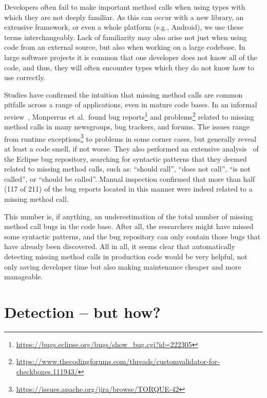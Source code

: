 Developers often fail to make important method calls when using types with which they are not deeply familiar.
As this can occur with a new library, an extensive framework, or even a whole platform (e.g., Android), we use these terms interchangeably.
Lack of familiarity may also arise not just when using code from an external source, but also when working on a large codebase.
In large software projects it is common that one developer does not know all of the code, and thus, they will often encounter types which they do not know how to use correctly.

Studies have confirmed the intuition that missing method calls are common pitfalls across a range of applications, even in mature code bases.
In an informal review~\cite{monperrus2010detecting}, Monperrus et al.\ found bug reports\footnote{\url{https://bugs.eclipse.org/bugs/show_bug.cgi?id=222305}} and problems\footnote{\url{https://www.thecodingforums.com/threads/customvalidator-for-checkboxes.111943/}} related to missing method calls in many newsgroups, bug trackers, and forums.
The issues range from runtime exceptions\footnote{\url{https://issues.apache.org/jira/browse/TORQUE-42}} to problems in some corner cases, but generally reveal at least a code smell, if not worse.
They also performed an extensive analysis~\cite{monperrus2013detecting} of the Eclipse bug repository,
searching for syntactic patterns that they deemed related to missing method calls, such as: ``should call'', ``does not call'', ``is not called'', or ``should be called''.
Manual inspection confirmed that more than half (117 of 211) of the bug reports located in this manner were indeed related to a missing method call.

This number is, if anything, an underestimation of the total number of missing method call bugs in the code base.
After all, the researchers might have missed some syntactic patterns, and the bug repository can only contain those bugs that have already been discovered.
All in all, it seems clear that automatically detecting missing method calls in production code would be very helpful, not only saving developer time but also making maintenance cheaper and more manageable.

\section{Detection -- but how?}

